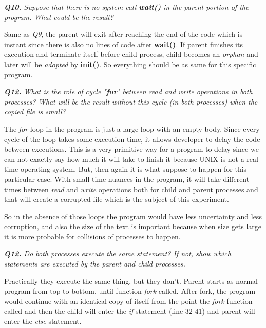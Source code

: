 \documentclass[11pt]{article}
\begin{document}
\vspace{5mm}
\textit{\textbf{Q10.} Suppose that there is no system call \textbf{wait()} in the parent portion of the program. What could be the result?}
\vspace{5mm}

Same as \textit{Q9}, the parent will exit after reaching the end of the code which is instant since there is also no lines of code after \textbf{wait()}. If parent finishes its execution and terminate itself before child process, child becomes an \textit{orphan} and later will be \textit{adopted} by \textbf{init()}. So everything should be as same for this specific program.

\vspace{5mm}
\textit{\textbf{Q12.} What is the role of cycle "\textbf{for}" between read and write operations in both processes? What will be the result without this cycle (in both processes) when the copied file is small?}
\vspace{5mm}

The \textit{for} loop in the program is just a large loop with an empty body. Since every cycle of the loop takes some execution time, it allows developer to delay the code between executions. This is a very primitive way for a program to delay since we can not exactly say how much it will take to finish it because UNIX is not a real-time operating system. But, then again it is what suppose to happen for this particular case. With small time nuances in the program, it will take different times between \textit{read} and \textit{write} operations both for child and parent processes and that will create a corrupted file which is the subject of this experiment.

So in the absence of those loops the program would have less uncertainty and less corruption, and also the size of the text is important because when size gets large it is more probable for collisions of processes to happen.



\vspace{5mm}
\textit{\textbf{Q12.} Do both processes execute the same statement? If not, show which statements are executed by the parent and child processes.}
\vspace{5mm}

Practically they execute the same thing, but they don't. Parent starts as normal program from top to bottom, until function \textit{fork} called. After fork, the program would continue with an identical copy of itself from the point the \textit{fork} function called and then the child will enter the \textit{if} statement (line 32-41) and parent will enter the \textit{else} statement.
\end{document}
